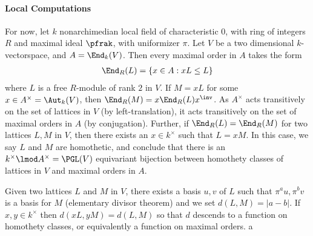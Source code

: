 \documentclass{article}
\begin{document}
\paragraph*{Local Computations} 
For now, let $k$ nonarchimedian local field of characteristic $0$, with ring of integers $R$ and maximal ideal $\pfrak$, with uniformizer $\pi$. Let $V$ be a two dimensional $k$-vectorspace, and $A = \End_k(V)$. Then every maximal order in $A$ takes the form 
\begin{align*}
    \End_R(L) = \{ x \in A : xL\leq L\}
\end{align*}
where $L$ is a free $R$-module of rank $2$ in $V$. If $M = xL$ for some $x\in A^\times = \Aut_k(V)$, then $\End_R(M) = x\End_R(L)x^\inv$. As $A^\times$ acts transitively on the set of lattices in $V$ (by left-translation), it acts transitively on the set of maximal orders in $A$ (by conjugation). Further, if $\End_R(L)=\End_R(M)$ for two lattices $L,M$ in $V$, then there exists an $x \in k^\times$ such that $L = x M$. In this case, we say $L$ and $M$ are homothetic, and conclude that there is an $k^\times \lmod A^\times = \PGL(V)$ equivariant bijection between homothety classes of lattices in $V$ and maximal orders in $A$. 

Given two lattices $L$ and $M$ in $V$, there exists a basis $u,v$ of $L$ such that $\pi^a u , \pi^b v$ is a basis for $M$ (elementary divisor theorem) and we set $d(L,M) = |a-b|$. If $x,y\in k^\times$ then $d(xL,yM)=d(L,M)$ so that $d$ descends to a function on homothety classes, or equivalently a function on maximal orders. a
\end{document}
